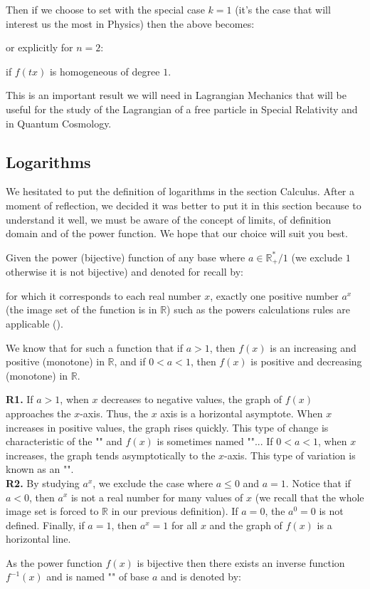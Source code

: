 	Then if we choose to set with the special case $k=1$ (it's the case that will interest us the most in Physics) then the above becomes:
	
	or explicitly for $n=2$:
	
	if $f(tx)$ is homogeneous of degree $1$.
	
	This is an important result we will need in Lagrangian Mechanics that will be useful for the study of the Lagrangian of a free particle in Special Relativity and in Quantum Cosmology.
	
	
			
	\pagebreak
	\subsection{Logarithms}\label{logarithms}
	We hesitated to put the definition of logarithms in the section Calculus. After a moment of reflection, we decided it was better to put it in this section because to understand it well, we must be aware of the concept of limits, of definition domain and of the power function. We hope that our choice will suit you best.
	
	Given the power (bijective) function of any base where $a \in \mathbb{R}_{+}^{*}/1$ (we exclude $1$ otherwise it is not bijective) and denoted for recall by:
	
	for which it corresponds to each real number $x$, exactly one positive number $a^x$ (the image set of the function is in $\mathbb{R}$) such as the powers calculations rules are applicable ().
	
	We know that for such a function that if $a>1$, then $f (x)$ is an increasing and positive (monotone) in $\mathbb{R}$, and if $0<a<1$, then $f(x)$ is positive and decreasing (monotone) in $\mathbb{R}$.
	
	\begin{tcolorbox}[title=Remarks,colframe=black,arc=10pt]
	\textbf{R1.} If $a>1$, when $x$ decreases to negative values, the graph of $f (x)$ approaches the $x$-axis. Thus, the $x$ axis is a horizontal asymptote. When $x$ increases in positive values, the graph rises quickly. This type of change is characteristic of the "" and $f(x)$ is sometimes named ""... If $0<a<1$, when $x$ increases, the graph tends asymptotically to the $x$-axis. This type of variation is known as an "".\\
	
	\textbf{R2.} By studying $a^x$, we exclude the case where $a\leq 0$ and $a=1$. Notice that if $a<0$, then $a^x$ is not a real number for many values of $x$ (we recall that the whole image set is forced to $\mathbb{R}$ in our previous definition). If $a=0$, the $a^0=0$ is not defined. Finally, if $a=1$, then $a^x=1$ for all $x$ and the graph of $f(x)$ is a horizontal line.
	\end{tcolorbox}
	As the power function $f (x)$ is bijective then there exists an inverse function $f^{-1}(x)$ and is named "" of base $a$ and is denoted by:
	
